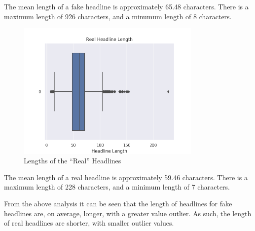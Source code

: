 The mean length of a fake headline is approximately 65.48 characters. There is a
maximum length of 926 characters, and a minumum length of 8 characters.

\begin{figure}[H]
	\centering
	\includegraphics[width=0.8\textwidth]{images/realHeadlineLength}
	\caption{Lengths of the ``Real'' Headlines}
	\label{fig:realLength}
\end{figure}

The mean length of a real headline is approximately 59.46 characters. There is a
maximum length of 228 characters, and a minimum length of 7 characters.

\par From the above analysis it can be seen that the length of headlines for
fake headlines are, on average, longer, with a greater value outlier. As such,
the length of real headlines are shorter, with smaller outlier values.

